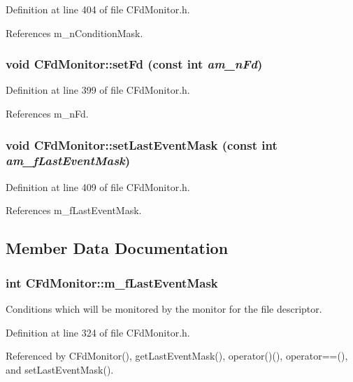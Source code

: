 Definition at line 404 of file CFd\-Monitor.h.

References m\_\-n\-Condition\-Mask.
\subsubsection{\setlength{\rightskip}{0pt plus 5cm}void CFd\-Monitor::set\-Fd (const int {\em am\_\-n\-Fd})\hspace{0.3cm}{\tt  [inline, protected]}}\label{classCFdMonitor_b0}




Definition at line 399 of file CFd\-Monitor.h.

References m\_\-n\-Fd.
\subsubsection{\setlength{\rightskip}{0pt plus 5cm}void CFd\-Monitor::set\-Last\-Event\-Mask (const int {\em am\_\-f\-Last\-Event\-Mask})\hspace{0.3cm}{\tt  [inline, protected]}}\label{classCFdMonitor_b2}




Definition at line 409 of file CFd\-Monitor.h.

References m\_\-f\-Last\-Event\-Mask.

\subsection{Member Data Documentation}
\subsubsection{\setlength{\rightskip}{0pt plus 5cm}int CFd\-Monitor::m\_\-f\-Last\-Event\-Mask\hspace{0.3cm}{\tt  [private]}}\label{classCFdMonitor_o2}


Conditions which will be monitored by  the monitor for the file descriptor. 

Definition at line 324 of file CFd\-Monitor.h.

Referenced by CFd\-Monitor(), get\-Last\-Event\-Mask(), operator()(), operator==(), and set\-Last\-Event\-Mask().
